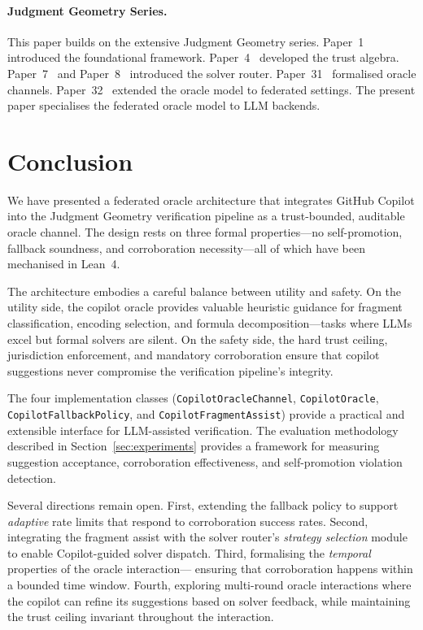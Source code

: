 \documentclass[11pt]{article}
\newcommand{\CopChan}{\texttt{CopilotOracleChannel}}
\newcommand{\CopOracle}{\texttt{CopilotOracle}}
\newcommand{\CopFallback}{\texttt{CopilotFallbackPolicy}}
\newcommand{\CopFragment}{\texttt{CopilotFragmentAssist}}
\begin{document}
\paragraph{Judgment Geometry Series.}
This paper builds on the extensive Judgment Geometry series.
Paper~1~\cite{young2024jg1} introduced the foundational framework.
Paper~4~\cite{young2024jg4} developed the trust algebra.
Paper~7~\cite{young2024jg7} and Paper~8~\cite{young2024jg8}
introduced the solver router.  Paper~31~\cite{young2024jg31}
formalised oracle channels.  Paper~32~\cite{young2024jg32}
extended the oracle model to federated settings.  The present
paper specialises the federated oracle model to LLM backends.


\section{Conclusion}\label{sec:conclusion}

We have presented a federated oracle architecture that integrates
GitHub Copilot into the Judgment Geometry verification pipeline as
a trust-bounded, auditable oracle channel.  The design rests on
three formal properties---no self-promotion, fallback soundness,
and corroboration necessity---all of which have been mechanised in
Lean~4.

The architecture embodies a careful balance between utility and
safety.  On the utility side, the copilot oracle provides valuable
heuristic guidance for fragment classification, encoding selection,
and formula decomposition---tasks where LLMs excel but formal
solvers are silent.  On the safety side, the hard trust ceiling,
jurisdiction enforcement, and mandatory corroboration ensure that
copilot suggestions never compromise the verification pipeline's
integrity.

The four implementation classes (\CopChan{}, \CopOracle{},
\CopFallback{}, and \CopFragment{}) provide a practical and
extensible interface for LLM-assisted verification.  The evaluation
methodology described in Section~\ref{sec:experiments} provides
a framework for measuring suggestion acceptance, corroboration
effectiveness, and self-promotion violation detection.

Several directions remain open.  First, extending the fallback
policy to support \emph{adaptive} rate limits that respond to
corroboration success rates.  Second, integrating the fragment
assist with the solver router's \emph{strategy selection} module
to enable Copilot-guided solver dispatch.  Third, formalising the
\emph{temporal} properties of the oracle interaction---\eg{}
ensuring that corroboration happens within a bounded time window.
Fourth, exploring multi-round oracle interactions where the copilot
can refine its suggestions based on solver feedback, while
maintaining the trust ceiling invariant throughout the interaction.
\end{document}
